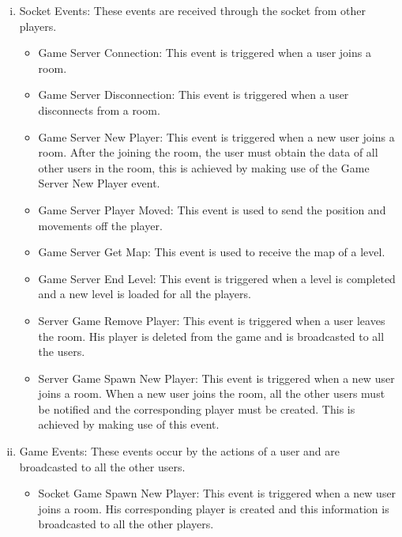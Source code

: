\documentclass[oneside,12pt]{Classes/VTU}
\begin{document}
				\begin{enumerate}[i.]
					\item Socket Events: These events are received through the socket from other players. 
					\begin{itemize}
						\item Game Server Connection: This event is triggered when a user joins a room.
						
						\item Game Server Disconnection: This event is triggered when a user disconnects from a room.
						
						\item Game Server New Player: This event is triggered when a new user joins a room. After the joining the room, the user must obtain the data of all other users in the room, this is achieved by making use of the Game Server New Player event.
												
						\item Game Server Player Moved: This event is used to send the position and movements off the player.
						
						\item Game Server Get Map: This event is used to receive the map of a level. 
						
						\item Game Server End Level: This event is triggered when a level is completed and a new level is loaded for all the players.
						
						\item Server Game Remove Player: This event is triggered when a user leaves the room. His player is deleted from the game and is broadcasted to all the users.  

						\item Server Game Spawn New Player: This event is triggered when a new user joins a room. When a new user joins the room, all the other users must be notified and the corresponding player must be created. This is achieved by making use of this event. 

					\end{itemize}			
					\item Game Events: These events occur by the actions of a user and are broadcasted to all the other users. 
					\begin{itemize}
						\item Socket Game Spawn New Player: This event is triggered when a new user joins a room. His corresponding player is created and this information is broadcasted to all the other players. 
						

\end{itemize}
\end{enumerate}
\end{document}

